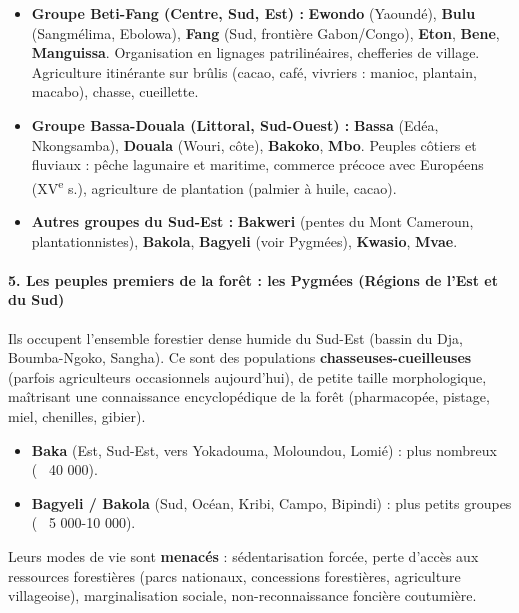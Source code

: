 \documentclass[11pt]{article}
\newcommand{\cle}[1]{{\popxbold\color{popdark}#1}}
\begin{document}
\begin{itemize}
    \item \textbf{Groupe Beti-Fang (Centre, Sud, Est) :} \textbf{Ewondo} (Yaoundé), \textbf{Bulu} (Sangmélima, Ebolowa), \textbf{Fang} (Sud, frontière Gabon/Congo), \textbf{Eton}, \textbf{Bene}, \textbf{Manguissa}. Organisation en lignages patrilinéaires, chefferies de village. Agriculture itinérante sur brûlis (cacao, café, vivriers : manioc, plantain, macabo), chasse, cueillette.
    \item \textbf{Groupe Bassa-Douala (Littoral, Sud-Ouest) :} \textbf{Bassa} (Edéa, Nkongsamba), \textbf{Douala} (Wouri, côte), \textbf{Bakoko}, \textbf{Mbo}. Peuples côtiers et fluviaux : pêche lagunaire et maritime, commerce précoce avec Européens (XV\textsuperscript{e} s.), agriculture de plantation (palmier à huile, cacao).
    \item \textbf{Autres groupes du Sud-Est :} \textbf{Bakweri} (pentes du Mont Cameroun, plantationnistes), \textbf{Bakola}, \textbf{Bagyeli} (voir Pygmées), \textbf{Kwasio}, \textbf{Mvae}.
\end{itemize}

\paragraph{5. Les peuples premiers de la forêt : les Pygmées (Régions de l'Est et du Sud)}
Ils occupent l'ensemble \cle{forestier dense humide} du Sud-Est (bassin du Dja, Boumba-Ngoko, Sangha). Ce sont des populations \textbf{chasseuses-cueilleuses} (parfois agriculteurs occasionnels aujourd'hui), de petite taille morphologique, maîtrisant une connaissance encyclopédique de la forêt (pharmacopée, pistage, miel, chenilles, gibier).

\begin{itemize}
    \item \textbf{Baka} (Est, Sud-Est, vers Yokadouma, Moloundou, Lomié) : plus nombreux (~ 40 000).
    \item \textbf{Bagyeli / Bakola} (Sud, Océan, Kribi, Campo, Bipindi) : plus petits groupes (~ 5 000-10 000).
\end{itemize}
Leurs modes de vie sont \textbf{menacés} : sédentarisation forcée, perte d'accès aux ressources forestières (parcs nationaux, concessions forestières, agriculture villageoise), marginalisation sociale, non-reconnaissance foncière coutumière.
\end{document}
